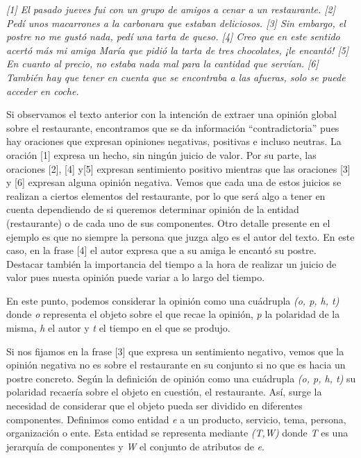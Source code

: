 			\begin{center}
			\begin{minipage}{0.9\linewidth}
				\vspace{5pt}%
				{\small
					\textit{[1] El pasado jueves fui con un grupo de amigos a cenar a un restaurante. [2] Pedí unos macarrones a la carbonara que estaban deliciosos. [3] Sin embargo, el postre no me gustó nada, pedí una tarta de queso. [4] Creo que en este sentido acertó más mi amiga María que pidió la tarta de tres chocolates, ¡le encantó! [5] En cuanto al precio, no estaba nada mal para la cantidad que servían. [6] También hay que  tener en cuenta que se encontraba a las afueras, solo se puede acceder en coche.}
				}
				\vspace{5pt}%
			\end{minipage}
		\end{center}
	

	Si observamos el texto anterior con la intención de extraer una opinión global sobre el restaurante, encontramos que se da información ``contradictoria'' pues hay oraciones que expresan opiniones negativas, positivas e incluso neutras. La oración [1] expresa un hecho, sin ningún juicio de valor. Por su parte, las oraciones [2], [4] y[5] expresan sentimiento positivo mientras que las oraciones [3] y [6] expresan alguna opinión negativa. Vemos que cada una de estos juicios se realizan a ciertos elementos del restaurante, por lo que será algo a tener en cuenta dependiendo de si queremos determinar opinión de la entidad (restaurante) o de cada uno de sus componentes. Otro detalle presente en el ejemplo es que no siempre la persona que juzga algo es el autor del texto. En este caso, en la frase [4] el autor expresa que a su amiga le encantó su postre. Destacar también la importancia del tiempo a la hora de realizar un juicio de valor pues nuesta opinión puede variar a lo largo del tiempo. 
	
	En este punto, podemos considerar la opinión como una cuádrupla \textit{(o, p, h, t)} donde \textit{o} representa el objeto sobre el que recae la opinión, \textit{p} la polaridad de la misma, \textit{h} el autor y \textit{t} el tiempo en el que se produjo.
	
	Si nos fijamos en la frase [3] que expresa un sentimiento negativo, vemos que la opinión negativa no es sobre el restaurante en su conjunto si no que  es hacia un postre concreto. Según la definición de opinión como una cuádrupla \textit{(o, p, h, t)} su polaridad recaería sobre el objeto en cuestión, el restaurante. Así, surge la necesidad de considerar que el objeto pueda ser dividido en diferentes componentes. Definimos como entidad \textit{e} a un producto, servicio, tema, persona, organización o ente. Esta entidad se representa mediante \textit{(T,W)} donde \textit{T} es una jerarquía de componentes y \textit{W} el conjunto de atributos de \textit{e}. 
	
